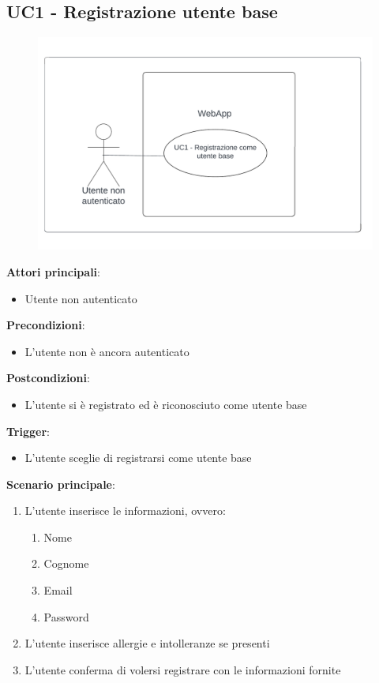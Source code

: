 \subsection{UC1 - Registrazione utente base}\label{usecase:1}
\begin{figure}[H]
  \centering
  \includegraphics[width=\textwidth]{ucd/UCD1_corretto.png}
\end{figure}
\textbf{Attori principali}: 
\begin{itemize}
    \item Utente non autenticato
\end{itemize}
\textbf{Precondizioni}:
\begin{itemize}
    \item L'utente non è ancora autenticato
\end{itemize}
\textbf{Postcondizioni}: 
\begin{itemize}
    \item L'utente si è registrato ed è riconosciuto come utente base 
\end{itemize}
\textbf{Trigger}:
\begin{itemize}
    \item L'utente sceglie di registrarsi come utente base
\end{itemize}
\textbf{Scenario principale}:
\begin{enumerate}
    \item L'utente inserisce le informazioni, ovvero:
    \begin{enumerate}
        \item Nome
        \item Cognome
        \item Email
        \item Password
    \end{enumerate}
    \item L'utente inserisce allergie e intolleranze se presenti
    \item L'utente conferma di volersi registrare con le informazioni fornite
\end{enumerate}
